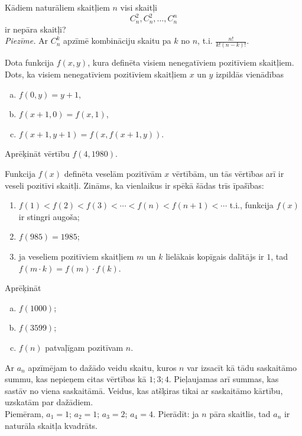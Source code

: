\documentclass[a4paper,12pt]{article}
\begin{document}
\vspace{10pt}
\begin{problem}
Kādiem naturāliem skaitļiem $n$ visi skaitļi 
\[ C_n^2,C_n^2,\ldots,C_n^n \]	 
ir nepāra skaitļi?\\
{\em Piezīme.} Ar $C_n^k$ apzīmē kombināciju skaitu pa $k$ no $n$, t.i. $\displaystyle{ \frac{n!}{k!(n-k)!}}$.
\end{problem}


\vspace{10pt}
\begin{problem}
Dota funkcija  $f(x,y)$, kura definēta visiem nenegatīviem pozitīviem skaitļiem. 
Dots, ka visiem nenegatīviem pozitīviem skaitļiem $x$ un $y$ izpildās vienādības
\begin{enumerate}[(a)]
\item $f(0,y) = y+1$,
\item $f(x+1,0) = f(x,1)$,
\item $f(x+1,y+1) = f(x,f(x+1,y))$.
\end{enumerate}
Aprēķināt vērtību $f(4,1980)$.
\end{problem}


\vspace{10pt}
\begin{problem}
Funkcija  $f(x)$ definēta veselām pozitīvām $x$ vērtībām, un tās vērtības arī ir veseli pozitīvi skaitļi. 
Zināms, ka vienlaikus ir spēkā šādas trīs īpašības:
\begin{enumerate}[(1)]
\item $f(1) < f(2) < f(3) < \cdots < f(n) < f(n+1) < \cdots$ t.i., funkcija $f(x)$ ir stingri augoša;
\item $f(985) = 1985$;
\item ja veseliem pozitīviem skaitļiem $m$ un $k$ lielākais kopīgais dalītājs ir $1$, tad 
$f(m \cdot k) = f(m) \cdot f(k)$.
\end{enumerate}
Aprēķināt 
\begin{enumerate}[(a)]
\item $f(1000)$;
\item $f(3599)$;
\item $f(n)$ patvaļīgam pozitīvam $n$.
\end{enumerate}
\end{problem}



\vspace{10pt}
\begin{problem}
Ar $a_n$ apzīmējam to dažādo veidu skaitu, kuros $n$ var izsacīt kā tādu saskaitāmo summu, 
kas nepieņem citas vērtības kā $1; 3; 4$. Pieļaujamas arī summas, kas sastāv no viena saskaitāmā. Veidus, kas atšķiras tikai ar saskaitāmo kārtību, uzskatām par dažādiem.\\
Piemēram, $a_1=1$; $a_2=1$; $a_3=2$; $a_4=4$.
Pierādīt: ja $n$ \textendash{}  pāra skaitlis, tad $a_n$ ir naturāla skaitļa kvadrāts.
\end{problem}
\end{document}
